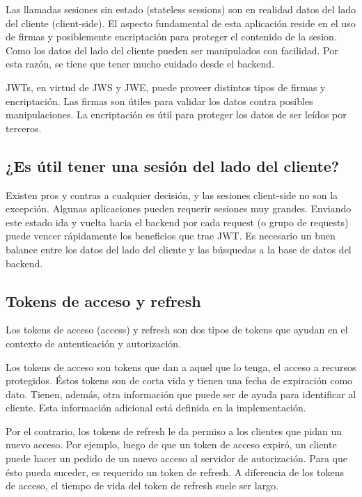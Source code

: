 Las llamadas sesiones sin estado (stateless sessions) son en realidad datos del lado del cliente (client-side). El aspecto fundamental de esta aplicación reside en el uso de firmas y posiblemente encriptación para proteger el contenido de la sesion. Como los datos del lado del cliente pueden ser manipulados con facilidad. Por esta razón, se tiene que tener mucho cuidado desde el backend.

JWTs, en virtud de JWS y JWE, puede proveer distintos tipos de firmas y encriptación. Las firmas son útiles para validar los datos contra posibles manipulaciones. La encriptación es útil para proteger los datos de ser leídos por terceros.

\subsection[¿Es útil tener una sesión del lado del cliente?]{¿Es útil tener una sesión del lado del cliente?}

Existen pros y contras a cualquier decisión, y las sesiones client-side no son la excepción. Algunas aplicaciones pueden requerir sesiones muy grandes. Enviando este estado ida y vuelta hacia el backend por cada request (o grupo de requests) puede vencer rápidamente los beneficios que trae JWT. Es necesario un buen balance entre los datos del lado del cliente y las búsquedas a la base de datos del backend.

\subsection[Tokens de acceso y refresh]{Tokens de acceso y refresh}

Los tokens de acceso (access) y refresh son dos tipos de tokens que ayudan en el contexto de autenticación y autorización.

Los tokens de acceso son tokens que dan a aquel que lo tenga, el acceso a recursos protegidos. Éstos tokens son de corta vida y tienen una fecha de expiración como dato. Tienen, además, otra información que puede ser de ayuda para identificar al cliente. Esta información adicional está definida en la implementación.

Por el contrario, los tokens de refresh le da permiso a los clientes que pidan un nuevo acceso. Por ejemplo, luego de que un token de acceso expiró, un cliente puede hacer un pedido de un nuevo acceso al servidor de autorización. Para que ésto pueda suceder, es requerido un token de refresh.
A diferencia de los tokens de acceso, el tiempo de vida del token de refresh suele ser largo.

